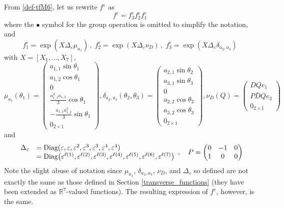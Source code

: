 \documentclass[a4paper,twoside]{article}
\def \RR {{\mathbb R}}
\def \eps {\varepsilon}
\newcommand{\tnm}[1]{\textnormal{#1}}
\begin{document}
From \eqref{def-tfM6}, let us rewrite $f^\eps$ as
\[
f^\eps = f_3^\eps f_2^\eps f_1^\eps
\]
where the $\bullet$ symbol for the group operation is omitted to simplify the notation, and
\begin{equation}
\label{def-fij}
f_1^\eps = \exp \left( X \Delta_\eps \mu_{a_1} \right) \, , \;
f_2^\eps = \exp \left(X \Delta_\eps \nu_D \right) \, , \;
f_3^\eps= \exp \left( X \Delta_\eps \delta_{a_2,a_3} \right) 
\end{equation}
with $X= [X_1, \ldots, X_7]$,
\begin{equation}
\label{app-mu}
\mu_{a_1}(\theta_1)= 
\begin{pmatrix}
a_{1,1} \sin \theta_1 \\
a_{1,2} \cos \theta_1 \\
0 \\
\frac{a_{1,1}^2 a_{1,2}}{3} \cos \theta_1 \\
-\frac{a_{1,1} a_{1,2}^2}{3} \sin \theta_1 \\
0_{2 \times 1} 
\end{pmatrix} , 
\delta_{a_2,a_3}(\theta_2,\theta_3)= 
\begin{pmatrix}
a_{2,1} \sin \theta_2 \\
a_{3,1} \sin \theta_3 \\
0 \\
a_{2,2} \cos \theta_2 \\
a_{3,2} \cos \theta_3 \\
0_{2 \times 1}
\end{pmatrix} ,
\nu_{D}(Q)= \begin{pmatrix}
D Q e_1 \\
P \bar D Q e_3 \\
0_{2 \times 1}
\end{pmatrix} 
\end{equation}
and
\[
\begin{array}{ll}
\Delta_\eps & = \tnm{Diag}(\eps,\eps,\eps^2,\eps^3,\eps^3,\eps^4,\eps^4) \\
 & = \tnm{Diag}\bigl( \eps^{\ell(1)},\eps^{\ell(2)},\eps^{\ell(3)},\eps^{\ell(4)},
\eps^{\ell(5)},\eps^{\ell(6)},\eps^{\ell(7)}\bigr) 
\end{array}, \quad
P= 
\begin{pmatrix}
0 & -1 & 0 \\
1 & 0 & 0
\end{pmatrix}
\]
Note the slight abuse of notation since $\mu_{a_1}$, $\delta_{a_2,a_3}$, $\nu_D$, and $\Delta_\eps$ so defined 
are not exactly the same as those defined in Section \ref{transverse_functions} (they have been extended as 
$\RR^7$-valued functions). The resulting expression of $f^\eps$, however, is the same. 
\end{document}
